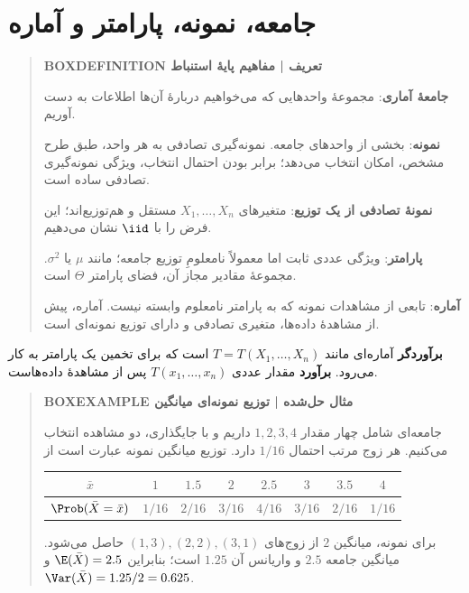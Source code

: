 \section{جامعه، نمونه، پارامتر و آماره}
\begin{quote}\textbf{BOXDEFINITION تعریف | مفاهیم پایهٔ استنباط}\par 
\textbf{جامعهٔ آماری}: مجموعهٔ واحدهایی که می‌خواهیم دربارهٔ آن‌ها اطلاعات به دست آوریم.

\textbf{نمونه}: بخشی از واحدهای جامعه. نمونه‌گیری تصادفی به هر واحد، طبق طرح مشخص، امکان انتخاب می‌دهد؛ برابر بودن احتمال انتخاب، ویژگی نمونه‌گیری تصادفی ساده است.

\textbf{نمونهٔ تصادفی از یک توزیع}: متغیرهای $X_1,\ldots,X_n$ مستقل و هم‌توزیع‌اند؛ این فرض را با $\iid$ نشان می‌دهیم.

\textbf{پارامتر}: ویژگی عددی ثابت اما معمولاً نامعلومِ توزیع جامعه؛ مانند $\mu$ یا $\sigma^2$. مجموعهٔ مقادیر مجاز آن، فضای پارامتر $\Theta$ است.

\textbf{آماره}: تابعی از مشاهدات نمونه که به پارامتر نامعلوم وابسته نیست. آماره، پیش از مشاهدهٔ داده‌ها، متغیری تصادفی و دارای توزیع نمونه‌ای است.
\end{quote}
\textbf{برآوردگر} آماره‌ای مانند $T=T(X_1,\ldots,X_n)$ است که برای تخمین یک پارامتر به کار می‌رود. \textbf{برآورد} مقدار عددی $T(x_1,\ldots,x_n)$ پس از مشاهدهٔ داده‌هاست.
\begin{quote}\textbf{BOXEXAMPLE مثال حل‌شده | توزیع نمونه‌ای میانگین}\par 
جامعه‌ای شامل چهار مقدار $1,2,3,4$ داریم و با جایگذاری، دو مشاهده انتخاب می‌کنیم. هر زوج مرتب احتمال $1/16$ دارد. توزیع میانگین نمونه عبارت است از

\begin{tabular}{c|ccccccc}
\toprule
$\bar x$&$1$&$1.5$&$2$&$2.5$&$3$&$3.5$&$4$\\
\midrule
$\Prob(\bar X=\bar x)$&$1/16$&$2/16$&$3/16$&$4/16$&$3/16$&$2/16$&$1/16$\\
\bottomrule
\end{tabular}
برای نمونه، میانگین $2$ از زوج‌های $(1,3),(2,2),(3,1)$ حاصل می‌شود. میانگین جامعه $2.5$ و واریانس آن $1.25$ است؛ بنابراین $\E(\bar X)=2.5$ و $\Var(\bar X)=1.25/2=0.625$.
\end{quote}
